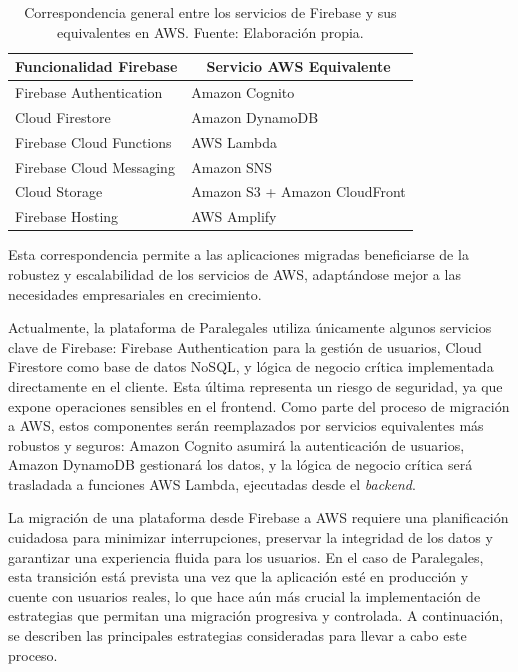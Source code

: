 \begin{table}[H]
  \centering
  \begin{tabular}{|l|l|}
    \hline
    \multicolumn{1}{|c|}{\textbf{Funcionalidad Firebase}} & \multicolumn{1}{c|}{\textbf{Servicio AWS Equivalente}} \\
    \hline
    Firebase Authentication & Amazon Cognito \\
    \hline
    Cloud Firestore & Amazon DynamoDB \\
    \hline
    Firebase Cloud Functions & AWS Lambda \\
    \hline
    Firebase Cloud Messaging & Amazon SNS \\
    \hline
    Cloud Storage & Amazon S3 + Amazon CloudFront \\
    \hline
    Firebase Hosting & AWS Amplify \\
    \hline
  \end{tabular}
  \caption{Correspondencia general entre los servicios de Firebase y sus equivalentes en AWS. Fuente: Elaboración propia.}
  \label{tab:aws_firebase_comparison_services}
\end{table}

Esta correspondencia permite a las aplicaciones migradas beneficiarse de la robustez y escalabilidad de los servicios de AWS, adaptándose mejor a las necesidades empresariales en crecimiento.

Actualmente, la plataforma de Paralegales utiliza únicamente algunos servicios clave de Firebase: Firebase Authentication para la gestión de usuarios, Cloud Firestore como base de datos NoSQL, y lógica de negocio crítica implementada directamente en el cliente. Esta última representa un riesgo de seguridad, ya que expone operaciones sensibles en el frontend. Como parte del proceso de migración a AWS, estos componentes serán reemplazados por servicios equivalentes más robustos y seguros: Amazon Cognito asumirá la autenticación de usuarios, Amazon DynamoDB gestionará los datos, y la lógica de negocio crítica será trasladada a funciones AWS Lambda, ejecutadas desde el \textit{backend}.

La migración de una plataforma desde Firebase a AWS requiere una planificación cuidadosa para minimizar interrupciones, preservar la integridad de los datos y garantizar una experiencia fluida para los usuarios. En el caso de Paralegales, esta transición está prevista una vez que la aplicación esté en producción y cuente con usuarios reales, lo que hace aún más crucial la implementación de estrategias que permitan una migración progresiva y controlada. A continuación, se describen las principales estrategias consideradas para llevar a cabo este proceso.


